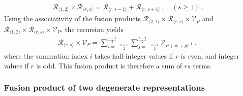 \documentclass[12pt, a4paper, notitlepage, twoside]{report}
\numberwithin{equation}{section}
\theoremstyle{break}
\begin{document}
\begin{align}
 \mathcal{R}_{\langle 1,2\rangle}\times \mathcal{R}_{\langle r,s\rangle} = \mathcal{R}_{\langle r,s-1\rangle} + \mathcal{R}_{\langle r,s+1\rangle }\ , \quad (s\geq 1)\ .
\end{align}
Using the associativity of the fusion products $\mathcal{R}_{\langle 2,1\rangle}\times \mathcal{R}_{\langle r,s\rangle}\times \mathcal{V}_P$ and $\mathcal{R}_{\langle 1,2\rangle}\times \mathcal{R}_{\langle r,s\rangle}\times \mathcal{V}_P$, the recursion yields
\begin{align}
 \boxed{\mathcal{R}_{\langle r,s \rangle}\times \mathcal{V}_P = \sum_{i=-\frac{r-1}{2}}^{\frac{r-1}{2}} \sum_{j=-\frac{s-1}{2}}^{\frac{s-1}{2}} \mathcal{V}_{P + ib+jb^{-1}}}
 \ ,
\label{rtv}
\end{align}
where the summation index $i$ takes half-integer values if $r$ is even, and integer values if $r$ is odd. 
This fusion product is therefore a sum of 
$rs$ terms.

\subsubsection{Fusion product of two degenerate representations}
\end{document}
